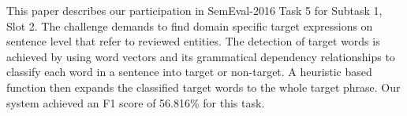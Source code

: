 This paper describes our participation in SemEval-2016 Task 5 for Subtask 1, Slot 2. The challenge demands to find domain specific target expressions on sentence level that refer to reviewed entities. The detection of target words is achieved by using word vectors and its grammatical dependency relationships to classify each word in a sentence into target or non-target. A heuristic based function then expands the classified target words to the whole target phrase. Our system achieved an F1 score of 56.816\% for this task.
